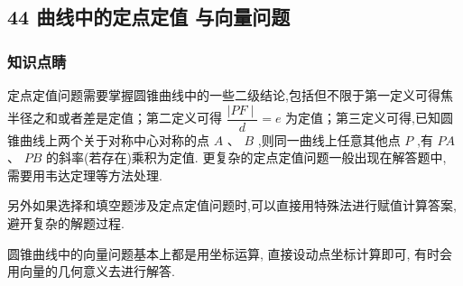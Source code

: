 \subsection*{44 曲线中的定点定值 与向量问题}

\subsubsection*{知识点睛}

定点定值问题需要掌握圆锥曲线中的一些二级结论,包括但不限于第一定义可得焦半径之和或者差是定值；第二定义可得 $\dfrac{\mid {PF} \mid  }{d} = e$ 为定值；第三定义可得,已知圆锥曲线上两个关于对称中心对称的点 $A$ 、 $B$ ,则同一曲线上任意其他点 $P$ ,有 ${PA}$ 、 ${PB}$ 的斜率(若存在)乘积为定值. 更复杂的定点定值问题一般出现在解答题中, 需要用韦达定理等方法处理.

另外如果选择和填空题涉及定点定值问题时,可以直接用特殊法进行赋值计算答案,避开复杂的解题过程.

圆锥曲线中的向量问题基本上都是用坐标运算, 直接设动点坐标计算即可, 有时会用向量的几何意义去进行解答.


